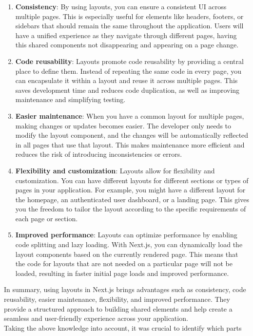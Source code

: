 \documentclass[./memory.tex]{subfiles}
\begin{document}
\begin{enumerate}[label = -]
	\item\textbf{Consistency}: By using layouts, you can ensure a consistent UI
	across multiple pages. This is especially useful for elements like
	headers, footers, or sidebars that should remain the same throughout the
	application. Users will have a unified experience as they navigate through
	different pages, having this shared components not disappearing and
	appearing on a page change.
	\item\textbf{Code reusability}: Layouts promote code reusability by
	providing a central place to define them. Instead of repeating the same
	code in every page, you can encapsulate it within a layout and reuse it
	across multiple pages. This saves development time and reduces code
	duplication, as well as improving maintenance and simplifying testing.
	\item\textbf{Easier maintenance}: When you have a common layout for multiple
	pages, making changes or updates becomes easier. The developer only needs
	to modify the layout component, and the changes will be automatically
	reflected in all pages that use that layout. This makes maintenance more
	efficient and reduces the risk of introducing inconsistencies or errors.
	\item\textbf{Flexibility and customization}: Layouts allow for flexibility
	and customization. You can have different layouts for different sections
	or types of pages in your application. For example, you might have a
	different layout for the homepage, an authenticated user dashboard, or a
	landing page. This gives you the freedom to tailor the layout according to
	the specific requirements of each page or section.
	\item\textbf{Improved performance}: Layouts can optimize performance by
	enabling code splitting and lazy loading. With Next.js, you can
	dynamically load the layout components based on the currently rendered
	page. This means that the code for layouts that are not needed on a
	particular page will not be loaded, resulting in faster initial page loads
	and improved performance.
\end{enumerate}
In summary, using layouts in Next.js brings advantages such as consistency, code
reusability, easier maintenance, flexibility, and improved performance. They
provide a structured approach to building shared elements and help create a
seamless and user-friendly experience across your application.
\\[8pt]
Taking the above knowledge into account, it was crucial to identify which parts
\end{document}
